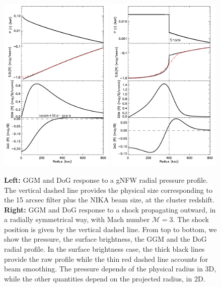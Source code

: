 \documentclass[traditabstract]{aa}
\begin{document}
\begin{figure}[h]
\centering
\includegraphics[trim=0cm 0cm 0cm 0cm, clip=true, width=0.49\textwidth]{Figure/Profiles_gNFW_15_15_45.pdf}
\includegraphics[trim=0cm 0cm 0cm 0cm, clip=true, width=0.49\textwidth]{Figure/Profiles_shock_15_15_45.pdf}
\caption{\footnotesize{{\bf Left:} GGM and DoG response to a gNFW radial pressure profile. The vertical dashed line provides the physical size corresponding to the 15 arcsec filter plus the NIKA beam size, at the cluster redshift. 
{\bf Right:} GGM and DoG response to a shock propagating outward, in a radially symmetrical way, with Mach number $\mathcal{M} = 3$. The shock position is given by the vertical dashed line. 
From top to bottom, we show the pressure, the surface brightness, the GGM and the DoG radial profile. In the surface brightness case, the thick black lines provide the raw profile while the thin red dashed line accounts for beam smoothing. The pressure depends of the physical radius in 3D, while the other quantities depend on the projected radius, in 2D.}}
\label{fig:test_filter_GNFW_and_shock}
\end{figure}
\end{document}
